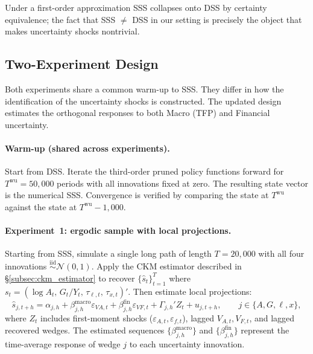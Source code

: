 Under a first-order approximation SSS collapses onto DSS by certainty
equivalence; the fact that SSS \(\neq\) DSS in our setting is precisely the
object that makes uncertainty shocks nontrivial.

\subsection{Two-Experiment Design}

Both experiments share a common warm-up to SSS. They differ in how the
identification of the uncertainty shocks is constructed. The updated design
estimates the orthogonal responses to both Macro (TFP) and Financial uncertainty.

\paragraph{Warm-up (shared across experiments).}
Start from DSS. Iterate the third-order pruned policy functions forward for
\(T^{\text{wu}}=50{,}000\) periods with all innovations fixed at zero. The
resulting state vector is the numerical SSS. Convergence is verified by
comparing the state at \(T^{\text{wu}}\) against the state at
\(T^{\text{wu}}-1{,}000\).

\paragraph{Experiment~1: ergodic sample with local projections.}
Starting from SSS, simulate a single long path of length \(T=20{,}000\) with
all four innovations \(\overset{\text{iid}}{\sim}\mathcal{N}(0,1)\).
Apply the CKM estimator described in \S\ref{subsec:ckm_estimator} to recover
\(\{\widehat{s}_t\}_{t=1}^T\) where
\(s_t=(\log A_t,\,G_t/Y_t,\,\tau_{\ell,t},\,\tau_{x,t})'\). Then estimate local
projections:
\begin{equation}
    \widehat{s}_{j,t+h}
    =
    \alpha_{j,h}
    +
    \beta_{j,h}^{\text{macro}}\varepsilon_{VA,t}
    +
    \beta_{j,h}^{\text{fin}}\varepsilon_{VF,t}
    +
    \Gamma_{j,h}'Z_t
    +
    u_{j,t+h},
    \qquad
    j\in\{A,G,\ell,x\},
    \label{eq:lp_sample}
\end{equation}
where \(Z_t\) includes first-moment shocks (\(\varepsilon_{A,t}, \varepsilon_{f,t}\)),
lagged \(V_{A,t}, V_{F,t}\), and lagged recovered wedges. The estimated sequences
\(\{\beta_{j,h}^{\text{macro}}\}\) and \(\{\beta_{j,h}^{\text{fin}}\}\) represent
the time-average response of wedge \(j\) to each uncertainty innovation.

